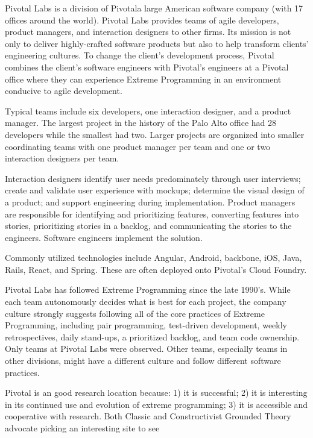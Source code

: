 Pivotal Labs is a division of Pivotal\textemdash a large American software company (with 17 offices around the world). Pivotal Labs provides teams of agile developers, product managers, and interaction designers to other firms. Its mission is not only to deliver highly-crafted software products but also to help transform clients' engineering cultures. To change the client's development process, Pivotal combines the client's software engineers with Pivotal's engineers at a Pivotal office where they can experience Extreme Programming \cite{BeckExtremeProgramming2004} in an environment conducive to agile development. 

Typical teams include six developers, one interaction designer, and a product manager. The largest project in the history of the Palo Alto office had 28 developers while the smallest had two. Larger projects are organized into smaller coordinating teams with one product manager per team and one or two interaction designers per team.

Interaction designers identify user needs predominately through user interviews; create and validate user experience with mockups; determine the visual design of a product; and support engineering during implementation. Product managers are responsible for identifying and prioritizing features, converting features into stories, prioritizing stories in a backlog, and communicating the stories to the engineers. Software engineers implement the solution. 

Commonly utilized technologies include Angular, Android, backbone, iOS, Java, Rails, React, and Spring. These are often deployed onto Pivotal's Cloud Foundry. 

Pivotal Labs has followed Extreme Programming \cite{BeckExtremeProgramming2004} since the late 1990's. While each team autonomously decides what is best for each project, the company culture strongly suggests following all of the core practices of Extreme Programming, including pair programming, test-driven development, weekly retrospectives, daily stand-ups, a prioritized backlog, and team code ownership. Only  teams at Pivotal Labs were observed. Other teams, especially teams in other divisions, might have a different culture and follow different software practices.

Pivotal is an good research location because: 1) it is successful; 2) it is interesting in its continued use and evolution of extreme programming; 3) it is accessible and cooperative with research. Both Classic and Constructivist Grounded Theory advocate picking an interesting site to see 

